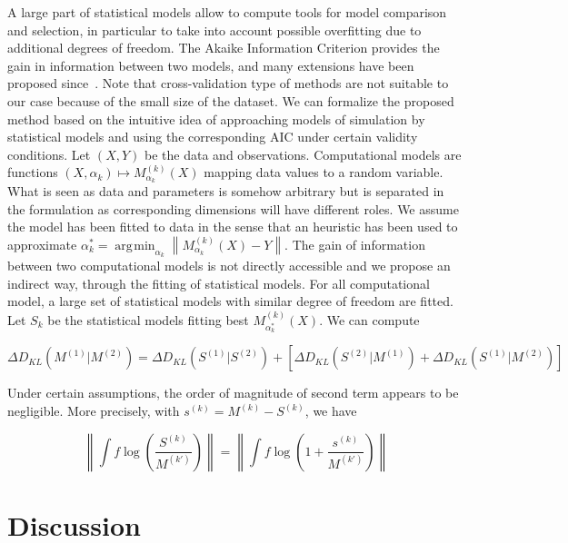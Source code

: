 \documentclass[Royal,sageh,times]{sagej}
\newcommand{\norm}[1]{\left\lVert #1 \right\rVert}
\DeclareMathOperator*{\argmin}{\arg\!\min}
\begin{document}

A large part of statistical models allow to compute tools for model comparison and selection, in particular to take into account possible overfitting due to additional degrees of freedom. The Akaike Information Criterion provides the gain in information between two models, and many extensions have been proposed since~\cite{}.%
Note that cross-validation type of methods are not suitable to our case because of the small size of the dataset. We can formalize the proposed method based on the intuitive idea of approaching models of simulation by statistical models and using the corresponding AIC under certain validity conditions. Let $(X,Y)$ be the data and observations. Computational models are functions $(X,\alpha_k) \mapsto M_{\alpha_k}^{(k)}(X)$ mapping data values to a random variable. What is seen as data and parameters is somehow arbitrary but is separated in the formulation as corresponding dimensions will have different roles. We assume the model has been fitted to data in the sense that an heuristic has been used to approximate $\alpha^{\ast}_k = \argmin_{\alpha_k}\norm{M_{\alpha_k}^{(k)}(X) - Y}$. The gain of information between two computational models is not directly accessible and we propose an indirect way, through the fitting of statistical models. For all computational model, a large set of statistical models with similar degree of freedom are fitted. %
Let $S_k$ be the statistical models fitting best $M^{(k)}_{\alpha^{\ast}_k}(X)$. We can compute

\[
\Delta D_{KL} \left(M^{(1)}|M^{(2)}\right) = \Delta D_{KL} \left(S^{(1)}|S^{(2)}\right) + \left[ \Delta D_{KL} \left(S^{(2)}|M^{(1)}\right) + \Delta D_{KL} \left(S^{(1)}|M^{(2)}\right) \right]
\]

Under certain assumptions, the order of magnitude of second term appears to be negligible. More precisely, with $s^{(k)}=M^{(k)}-S^{(k)}$, we have

\[
\norm{\int f \log{\left(\frac{S^{(k)}}{M^{(k')}}\right)}} = \norm{\int f \log{\left(1 + \frac{s^{(k)}}{M^{(k')}}\right)}}
\]


\section*{Discussion}

% 
%
%
\end{document}
